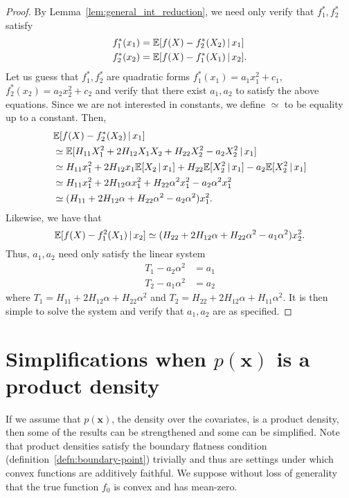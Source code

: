 \begin{proof}
By Lemma~\ref{lem:general_int_reduction}, we need only verify that $f^*_1, f^*_2$ satisfy
\begin{align*}
f^*_1(x_1) &= {\mathbb E}[ f(X) - f_2^*(X_2) {\,|\,} x_1] \\
f^*_2(x_2) &= {\mathbb E}[ f(X) - f_1^*(X_1) {\,|\,} x_2 ] .
\end{align*}
Let us guess that $f^*_1, f^*_2$ are quadratic forms $f^*_1(x_1) = a_1 x_1^2 + c_1$, $f^*_2(x_2) = a_2 x_2^2 + c_2$ and verify that there exist $a_1, a_2$ to satisfy the above equations. Since we are not interested in constants, we define $\simeq$ to be equality up to a constant. 
Then, 
\begin{align*}
&{\mathbb E}[ f(X) - f_2^*(X_2) {\,|\,} x_1]\\
& \simeq {\mathbb E}[ H_{11} X_1^2 + 2H_{12}X_1 X_2 + H_{22}X_2^2 - a_2 X_2^2 {\,|\,} x_1 ] \\ 
    &\simeq H_{11} x_1^2 + 2 H_{12} x_1 {\mathbb E}[X_2 {\,|\,} x_1] + H_{22} {\mathbb E}[X_2^2 {\,|\,} x_1] - a_2{\mathbb E}[X_2^2 {\,|\,} x_1] \\
   &\simeq H_{11} x_1^2 + 2H_{12} \alpha x_1^2 + H_{22} \alpha^2 x_1^2 - a_2 \alpha^2 x_1^2\\
   &\simeq (H_{11} + 2 H_{12} \alpha + H_{22} \alpha^2 - a_2 \alpha^2) x_1^2.
\end{align*}
Likewise, we have that
\[
{\mathbb E}[ f(X) - f_1^2(X_1) {\,|\,} x_2] \simeq (H_{22} + 2H_{12}\alpha + H_{22}\alpha^2 - a_1 \alpha^2) x_2^2.
\]
Thus, $a_1, a_2$ need only satisfy the linear system
\begin{align*}
T_1 - a_2 \alpha^2 &= a_1 \\
T_2 - a_1 \alpha^2 &= a_2 
\end{align*}
where $T_1 = H_{11} + 2H_{12} \alpha + H_{22} \alpha^2$ and $T_2 = H_{22} + 2H_{12} \alpha + H_{11} \alpha^2$.
It is then simple to solve the system and verify that $a_1, a_2$ are as specified.
\end{proof}


\section{Simplifications when $p(\mathbf{x})$ is a product density}
\label{sec:prod_density_simplification}

If we assume that $p(\mathbf{x})$, the density over the covariates, is a product density, then some of the results can be strengthened and some can be simplified. Note that product densities satisfy the boundary flatness condition (definition~\ref{defn:boundary-point}) trivially and thus are settings under which convex functions are additively faithful. We suppose without loss of generality that the true function $f_0$ is convex and has mean-zero.

